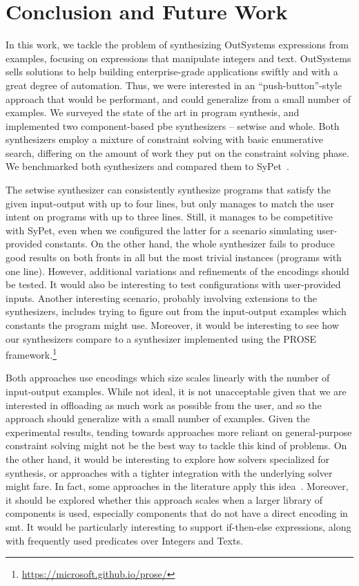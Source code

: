 \section{Conclusion and Future Work}
\label{sec:conclusion}

In this work, we tackle the problem of synthesizing OutSystems expressions from
examples, focusing on expressions that manipulate integers and text.
OutSystems sells solutions to help building enterprise-grade applications
swiftly and with a great degree of automation.
Thus, we were interested in an ``push-button''-style approach that would be
performant, and could generalize from a small number of examples.
We surveyed the state of the art in program synthesis, and implemented two
component-based \gls{pbe} synthesizers -- setwise and whole.
Both synthesizers employ a mixture of constraint solving with basic enumerative
search, differing on the amount of work they put on the constraint solving
phase.
We benchmarked both synthesizers and compared them to SyPet~\cite{Feng:2017:CSC}.

The setwise synthesizer can consistently synthesize programs that satisfy the
given input-output with up to four lines, but only manages to match the user
intent on programs with up to three lines.
Still, it manages to be competitive with SyPet, even when we configured the
latter for a scenario simulating user-provided constants.
On the other hand, the whole synthesizer fails to produce good results on both
fronts in all but the most trivial instances (programs with one line).
However, additional variations and refinements of the encodings should be
tested.
It would also be interesting to test configurations with user-provided inputs.
Another interesting scenario, probably involving extensions to the synthesizers,
includes trying to figure out from the input-output examples which constants the
program might use.
Moreover, it would be interesting to see how our synthesizers compare to a
synthesizer implemented using the PROSE
framework.\footnote{\url{https://microsoft.github.io/prose/}}

Both approaches use encodings which size scales linearly with the number of
input-output examples.
While not ideal, it is not unacceptable given that we are interested in
offloading as much work as possible from the user, and so the approach should
generalize with a small number of examples.
Given the experimental results, tending towards approaches more reliant on
general-purpose constraint solving might not be the best way to tackle this kind
of problems.
On the other hand, it would be interesting to explore how solvers specialized
for synthesis, or approaches with a tighter integration with the underlying
solver might fare.
In fact, some approaches in the literature apply this
idea~\cite{Feng:2018:PSU,Abate:2018:CMT}.
Moreover, it should be explored whether this approach scales when a larger
library of components is used, especially components that do not have a direct
encoding in \gls{smt}.
It would be particularly interesting to support if-then-else expressions, along
with frequently used predicates over Integers and Texts.
